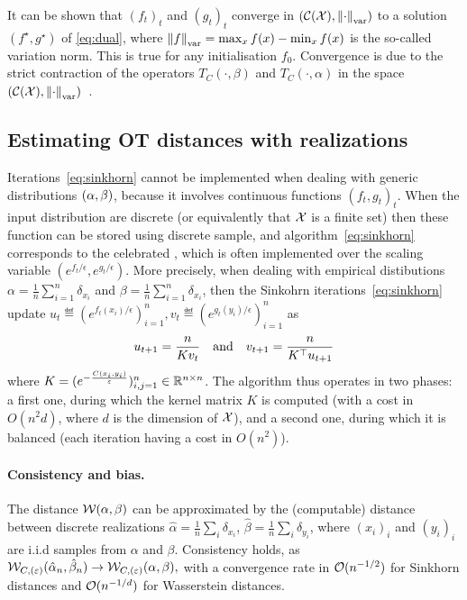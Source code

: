 It can be shown that ${(f_t)}_t$ and ${(g_t)}_t$ converge in $(\mathcal{C}(\mathcal{X}),
\left\| \cdot \right\|_{\text{var}})$ to a solution $(f^\star, g^\star)$ of
\eqref{eq:dual}, where $\left\| f \right\|_{\text{var}} = \max_x f(x) - \min_x f(x)$ is
the so-called variation norm. This is true for any initialisation $f_0$.%
Convergence is due to the strict contraction of the operators $T_C(\cdot, \beta)$ and
$T_{C}(\cdot, \alpha)$ in the space $(\mathcal{C}(\mathcal{X}), \left\| \cdot \right\|_{\text{var}})$~\cite{peyre2019computational}.

\subsection{Estimating OT distances with realizations}

Iterations~\eqref{eq:sinkhorn} cannot be implemented when dealing with generic distributions $(\alpha,\beta)$, because it involves continuous functions ${(f_t,g_t)}_t$. 
%
When the input distribution are discrete (or equivalently that $\mathcal{X}$ is a finite
set) then these function can be stored using discrete sample, and
algorithm~\eqref{eq:sinkhorn} corresponds to the celebrated
\citet{sinkhorn1967concerning}, which is often implemented over the scaling
variable $(e^{f_t/\epsilon},e^{g_t/\epsilon})$.
%
More precisely, when dealing with empirical distibutions $\alpha =
\frac{1}{n}\sum_{i=1}^n \delta_{x_i}$ and $\beta = \frac{1}{n} \sum_{i=1}^n
\delta_{x_i}$, then the Sinkohrn iterations~\eqref{eq:sinkhorn} update $u_t \eqdef
(e^{f_t(x_i)/\epsilon})_{i=1}^n, v_t \eqdef (e^{g_t(y_i)/\epsilon})_{i=1}^n$ as
\begin{equation*}
	u_{t+1} = \frac{n}{ K v_t }
	\quad \text{and} \quad
	v_{t+1} = \frac{n}{ K^\top u_{t+1} }
\end{equation*}
where $K=(e^{-\frac{C(x_i,y_i)}{\varepsilon}})_{i,j=1}^n \in \mathbb{R}^{n \times n}$. The algorithm thus operates in two
phases: a first one, during which the kernel matrix $K$ is computed (with a cost
in $O(n^2 d)$, where $d$ is the dimension of $\mathcal{X}$), and a second one, during
which it is balanced (each iteration having a cost in $O(n^2)$).


\paragraph{Consistency and bias.} The distance $\mathcal{W}(\alpha,\beta)$ can be
approximated by the (computable) distance between discrete realizations $\hat
\alpha = \frac{1}{n} \sum_i \delta_{x_i}$, $\hat \beta = \frac{1}{n} \sum_i
\delta_{y_i}$, where $(x_i)_i$ and $(y_i)_i$ are i.i.d samples from $\alpha$ and
$\beta$.  Consistency holds, as $\mathcal{W}_{C, (\varepsilon)}(\hat \alpha_n, \hat
\beta_n) \to \mathcal{W}_{C, (\varepsilon)}(\alpha, \beta),$ with a convergence rate in
$\mathcal{O}(n^{-1/2})$ for Sinkhorn distances and $\mathcal{O}(n^{-1/d})$ for Wasserstein
distances. 

